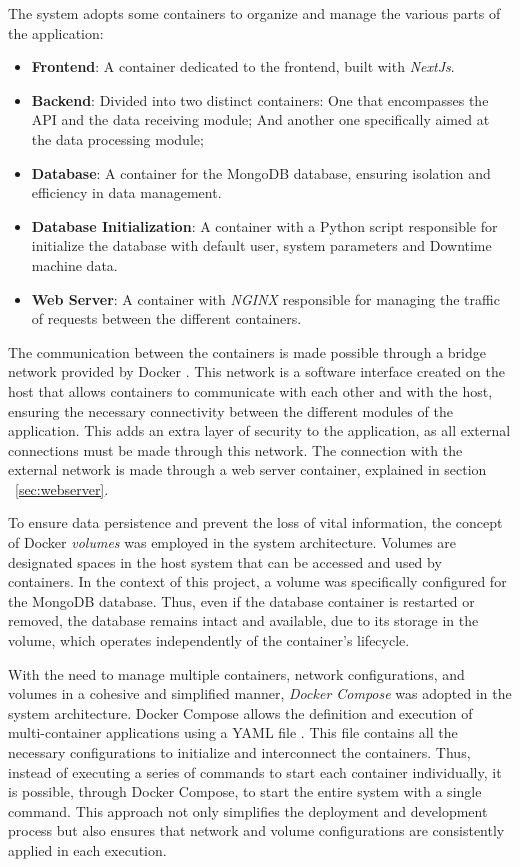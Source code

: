 The system adopts some containers to organize and manage the various parts of the application:
\begin{itemize}
    \item \textbf{Frontend}: A container dedicated to the frontend, built with \textit{NextJs}.
    \item \textbf{Backend}: Divided into two distinct containers:
	\subitem One that encompasses the \gls{API} and the data receiving module;
	\subitem And another one specifically aimed at the data processing module;
    \item \textbf{Database}: A container for the MongoDB database, ensuring isolation and efficiency in data management.
    \item \textbf{Database Initialization}: A container with a Python script responsible for initialize the database with default user, system parameters and Downtime machine data.
    \item \textbf{Web Server}: A container with \textit{NGINX} responsible for managing the traffic of requests between the different containers.
\end{itemize}

The communication between the containers is made possible through a bridge network provided by Docker \cite{dockerNetwork}. This network is a software interface created on the host that allows containers to communicate with each other and with the host, ensuring the necessary connectivity between the different modules of the application. This adds an extra layer of security to the application, as all external connections must be made through this network. The connection with the external network is made through a web server container, explained in section ~\ref{sec:webserver}.

To ensure data persistence and prevent the loss of vital information, the concept of Docker \textit{volumes} \cite{dockerVolumes} was employed in the system architecture. Volumes are designated spaces in the host system that can be accessed and used by containers. In the context of this project, a volume was specifically configured for the MongoDB database. Thus, even if the database container is restarted or removed, the database remains intact and available, due to its storage in the volume, which operates independently of the container's lifecycle.

With the need to manage multiple containers, network configurations, and volumes in a cohesive and simplified manner, \textit{Docker Compose} \cite{dockerCompose} was adopted in the system architecture. Docker Compose allows the definition and execution of multi-container applications using a YAML file \cite{yamlOrg}. This file contains all the necessary configurations to initialize and interconnect the containers. Thus, instead of executing a series of commands to start each container individually, it is possible, through Docker Compose, to start the entire system with a single command. This approach not only simplifies the deployment and development process but also ensures that network and volume configurations are consistently applied in each execution.

